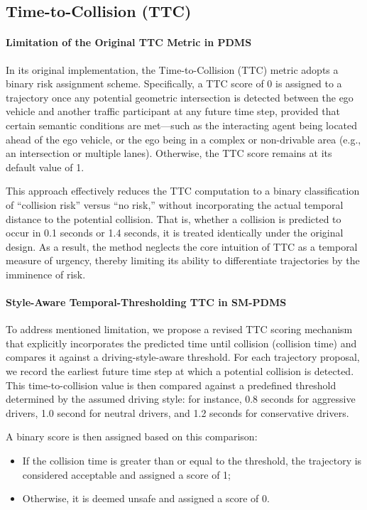 \documentclass{article}
\begin{document}
\subsection{Time-to-Collision (TTC)}

\paragraph{Limitation of the Original TTC Metric in PDMS}
In its original implementation, the Time-to-Collision (TTC) metric adopts a binary risk assignment scheme. Specifically, a TTC score of 0 is assigned to a trajectory once any potential geometric intersection is detected between the ego vehicle and another traffic participant at any future time step, provided that certain semantic conditions are met—such as the interacting agent being located ahead of the ego vehicle, or the ego being in a complex or non-drivable area (e.g., an intersection or multiple lanes). Otherwise, the TTC score remains at its default value of 1.

This approach effectively reduces the TTC computation to a binary classification of “collision risk” versus “no risk,” without incorporating the actual temporal distance to the potential collision. That is, whether a collision is predicted to occur in 0.1 seconds or 1.4 seconds, it is treated identically under the original design. As a result, the method neglects the core intuition of TTC as a temporal measure of urgency, thereby limiting its ability to differentiate trajectories by the imminence of risk.

\paragraph{Style-Aware Temporal-Thresholding TTC in SM-PDMS}
To address mentioned limitation, we propose a revised TTC scoring mechanism that explicitly incorporates the predicted time until collision (collision time) and compares it against a driving-style-aware threshold. For each trajectory proposal, we record the earliest future time step at which a potential collision is detected. This time-to-collision value is then compared against a predefined threshold determined by the assumed driving style: for instance, 0.8 seconds for aggressive drivers, 1.0 second for neutral drivers, and 1.2 seconds for conservative drivers.

A binary score is then assigned based on this comparison:
\begin{itemize}
    \item If the collision time is greater than or equal to the threshold, the trajectory is considered acceptable and assigned a score of 1;
    \item Otherwise, it is deemed unsafe and assigned a score of 0.
\end{itemize}
\end{document}
